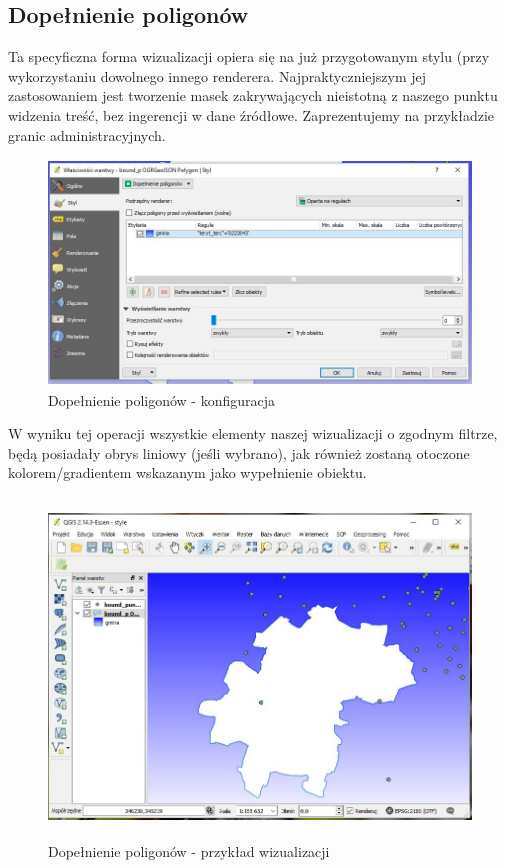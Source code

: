 \documentclass[12pt,a4paper]{book}
\begin{document}
\subsection{Dopełnienie poligonów}
Ta specyficzna forma wizualizacji opiera się na już przygotowanym stylu (przy wykorzystaniu dowolnego innego renderera. Najpraktyczniejszym jej zastosowaniem jest tworzenie masek zakrywających nieistotną z naszego punktu widzenia treść, bez ingerencji w dane źródłowe. Zaprezentujemy na przykładzie granic administracyjnych.
\begin{figure}[!ht]
	\centering
	\includegraphics[height=6cm]{007-dopelnienie-konf.jpg}
	\caption{Dopełnienie poligonów - konfiguracja}
\end{figure}

W wyniku tej operacji wszystkie elementy naszej wizualizacji o zgodnym filtrze, będą posiadały obrys liniowy (jeśli wybrano), jak również zostaną otoczone kolorem/gradientem wskazanym jako wypełnienie obiektu.

\begin{figure}[ht]
	\centering
	\includegraphics[height=9.0cm]{007-dopelnienie-wiz.jpg}
	\caption{Dopełnienie poligonów - przykład wizualizacji}
\end{figure}
\end{document}
